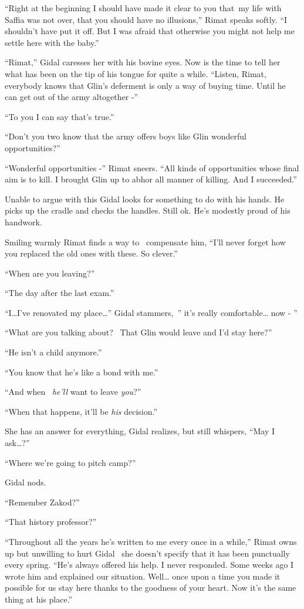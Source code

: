 \documentclass[twoside,11pt]{book}
\begin{document}
``Right at the beginning I should have made it clear to you that~my life with Saffia was not over, that you
should have no illusions,'' Rimat speaks softly. ``I shouldn't have put it off. But I was afraid that otherwise you
might not help me settle here with the baby.''

``Rimat,'' Gidal caresses her with his bovine eyes. Now is the time to tell her what has been
on the tip of his tongue for quite{ }a while. ``Listen, Rimat, everybody knows that Glin's
deferment is only a way of buying time. Until he can get out of the army altogether -''

``To you I can say that's true.''

``Don't you two know that the army offers boys like Glin wonderful opportunities?''

``Wonderful opportunities -'' Rimat sneers. ``All kinds of opportunities whose
final aim is to kill. I brought Glin up to abhor all manner of killing. And I succeeded.''

Unable to argue with this Gidal looks for something to do with his hands. He picks up the cradle and checks the handles.
Still ok. He's modestly proud of his handwork.

Smiling warmly Rimat finds a way to \ compensate him, ``I'll never forget how you replaced the old ones
with these. So clever.''

``When are you leaving?''

``The day after the last exam.''

``I{\dots}I've renovated my place{\dots}'' Gidal stammers,~'' it's really
comfortable{\dots} now - ''

``What are you talking about? \ That Glin would leave and I'd stay here?''

``He isn't a child anymore.''

``You know that he's like a bond{ }with me.''

``And when {\ }\textit{he'll} want to leave \textit{you}?''

``When that happens, it'll be \textit{his} decision.''

She has an answer for everything, Gidal realizes, but still whispers, ``May I ask{\dots}?''

``Where we're going to pitch camp?''

Gidal nods.

``Remember Zakod?''

``That history professor?''

``Throughout all the years he's written to me every once in a while,'' Rimat owns up but
unwilling to hurt Gidal \ she doesn't specify that it has been{
}{punctually}{ }every spring. ``He's always offered his help. I never
responded. Some weeks ago I wrote him and explained our situation. Well{\dots} once upon a time you made it possible
for us stay here thanks to{ }the goodness of your heart. Now it's the same thing at his
place.''
\end{document}
